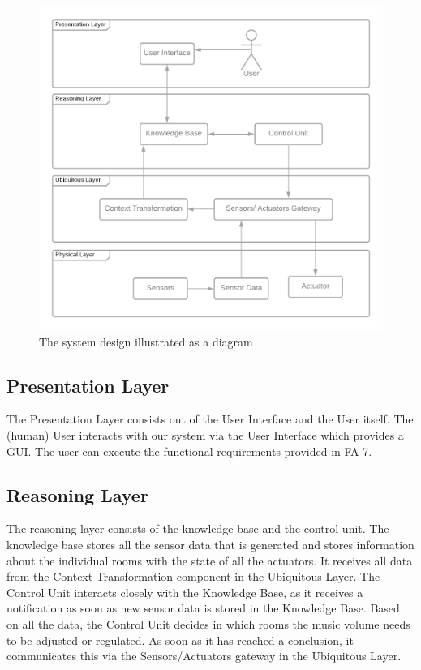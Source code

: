 \documentclass[runningheads]{llncs}
\begin{document}
    \begin{figure}
        \centering
        \includegraphics[width=\linewidth]{img/system-design.png}
        \caption{The system design illustrated as a diagram}
        \label{fig:system-design}
    \end{figure}

    \subsection{Presentation Layer}
    The Presentation Layer consists out of the User Interface and the User itself. The (human) User interacts with our system via the User Interface which provides a GUI. The user can execute the functional requirements provided in FA-7.

    \subsection{Reasoning Layer}
    The reasoning layer consists of the knowledge base and the control unit. The knowledge base stores all the sensor data that is generated and stores information about the individual rooms with the state of all the actuators. It receives all data from the Context Transformation component in the Ubiquitous Layer. The Control Unit interacts closely with the Knowledge Base, as it receives a notification as soon as new sensor data is stored in the Knowledge Base. Based on all the data, the Control Unit decides in which rooms the music volume needs to be adjusted or regulated. As soon as it has reached a conclusion, it communicates this via the Sensors/Actuators gateway in the Ubiquitous Layer.
\end{document}
